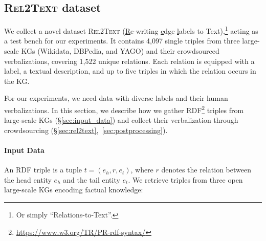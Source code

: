 % 









\subsection{\textsc{Rel2Text} dataset}
\label{sec:rel2text:data}
We collect a novel dataset \textsc{Rel2Text} (\underline{R}e-writing \underline{e}dge \underline{l}abels to Text),\footnote{Or simply ``Relations-to-Text''.} acting as a test bench for our experiments. It contains 4,097 single triples from three large-scale KGs (Wikidata, \mbox{DBPedia}, and YAGO) and their crowdsourced verbalizations, covering 1,522 unique relations. Each relation is equipped with a label, a textual description, and up to five triples in which the relation occurs in the KG.

For our experiments, we need data with diverse labels and their human verbalizations. In this section, we describe how we gather RDF\footnote{\url{https://www.w3.org/TR/PR-rdf-syntax/}} triples from large-scale KGs (§\ref{sec:input_data}) and collect their verbalization through crowdsourcing (§\ref{sec:rel2text},\ \ref{sec:postprocessing}).

\paragraph{Input Data}
An RDF triple is a tuple $t = (e_h, r, e_t)$, where $r$ denotes the relation between the head entity $e_h$ and the tail entity $e_t$.
We retrieve triples from three open large-scale KGs encoding factual knowledge:


